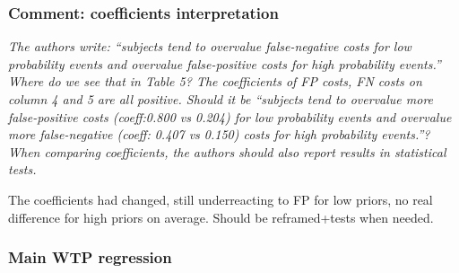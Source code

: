 \documentclass[11pt,hyperref={bookmarks=false}]{beamer}
\begin{document}
\begin{frame}
\frametitle{Comment: coefficients interpretation}
\footnotesize
\parbox{\textwidth}{

\textit{The authors write: “subjects tend to overvalue false-negative costs for low probability
events and overvalue false-positive costs for high probability events.” Where do we see
that in Table 5? The coefficients of FP costs, FN costs on column 4 and 5 are all positive.
Should it be “subjects tend to overvalue more false-positive costs (coeff:0.800 vs 0.204) for
low probability events and overvalue more false-negative (coeff: 0.407 vs 0.150) costs for
high probability events.”? When comparing coefficients, the authors should also report
results in statistical tests.}
}

\parbox{\textwidth}{

The coefficients had changed, still underreacting to FP for low priors, no real difference for high priors on average. Should be reframed+tests when needed.
}


\end{frame}


\begin{frame}
\frametitle{Main WTP regression}
\footnotesize
\begin{table}[htbp!]
\centering
{}
\end{table}		

\end{frame}
\end{document}

